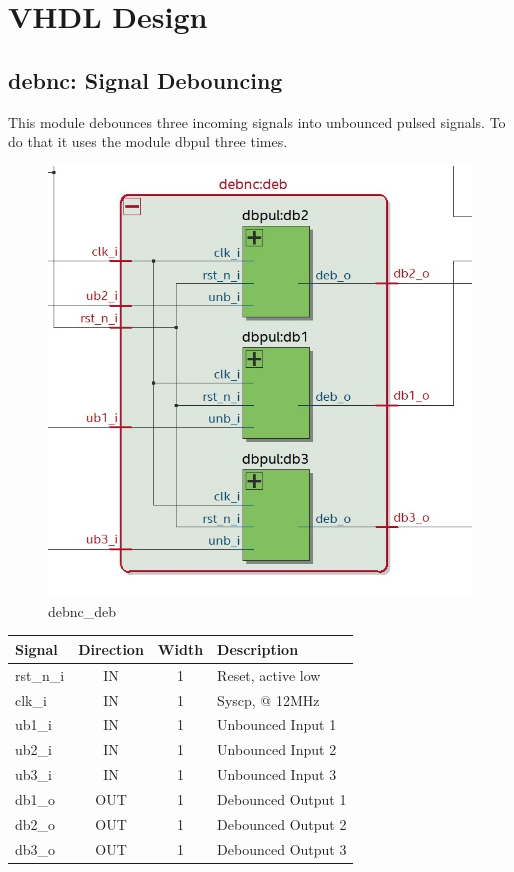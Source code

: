 \documentclass[12pt,a4 paper] {report}
\begin{document}
\newpage

\chapter{VHDL Design}
\section{debnc: Signal Debouncing}
This module debounces three incoming signals into unbounced pulsed signals. To do that it uses the module dbpul 
three times.
\begin{figure}[h]
	\centering	
	\includegraphics[scale=0.3]{../png/debnc_deb.png}
	\caption{debnc\_deb}
\end{figure}
\begin{center}
	\begin{tabular}{ | p{2cm} | c | c | p{5cm} |}
		\hline
		\textbf{Signal} & \textbf{Direction} & \textbf{Width} & \textbf{Description} \\
		\hline
		\hline
		rst\_n\_i & IN & 1 & Reset, active low \\
		\hline
		clk\_i & IN & 1 & Syscp, @ 12MHz \\
		\hline
		ub1\_i & IN & 1 & Unbounced Input 1 \\
		\hline
		ub2\_i & IN & 1 & Unbounced Input 2 \\
		\hline
		ub3\_i & IN & 1 & Unbounced Input 3 \\
		\hline
		db1\_o & OUT & 1 & Debounced Output 1 \\
		\hline
		db2\_o & OUT & 1 & Debounced Output 2 \\
		\hline
		db3\_o & OUT & 1 & Debounced Output 3 \\
		\hline
	\end{tabular}
\end{center}
\end{document}
